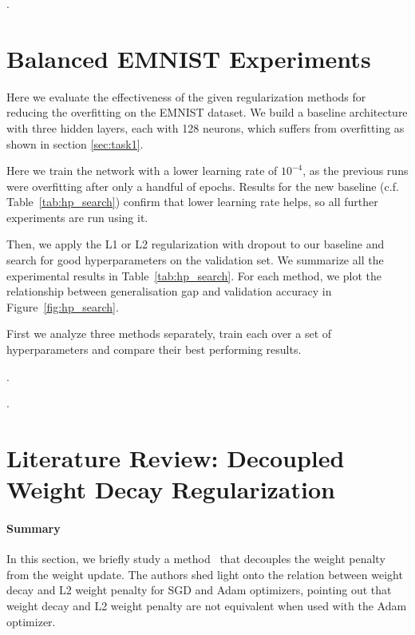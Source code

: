 \documentclass{article}
\begin{document}
\questionThirteen.


\section{Balanced EMNIST Experiments}

\questionTableThree

\questionFigureFour

\label{sec:task2.2}

Here we evaluate the effectiveness of the given regularization methods for reducing the overfitting on the EMNIST dataset.
We build a baseline architecture with three hidden layers, each with 128 neurons, which suffers from overfitting as shown in section \ref{sec:task1}.

Here we train the network with a lower learning rate of $10^{-4}$, as the previous runs were overfitting after only a handful of epochs. 
Results for the new baseline (c.f. Table~\ref{tab:hp_search}) confirm that lower learning rate helps, so all further experiments are run using it.

Then, we apply the L1 or L2 regularization with dropout to our baseline and search for good hyperparameters on the validation set. 
We summarize all the experimental results in Table~\ref{tab:hp_search}. For each method, we plot the relationship between generalisation gap and validation accuracy in Figure~\ref{fig:hp_search}.

First we analyze three methods separately, train each over a set of hyperparameters and compare their best performing results.

\questionFourteen.

\questionFifteen.


\section{Literature Review: Decoupled Weight Decay Regularization}
\label{sec:task3}

\paragraph{Summary}
In this section, we briefly study a method~\cite{loshchilov2019decoupled} that  decouples the weight penalty from the weight update.
The authors shed light onto the relation between weight decay and L2 weight penalty for SGD and Adam optimizers, pointing out that weight decay and L2 weight penalty are not equivalent when used with the Adam optimizer.
\end{document}
